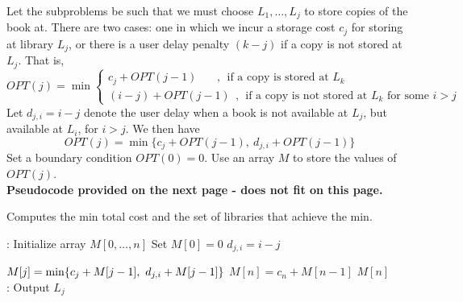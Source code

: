 \documentclass[twoside,11pt]{homework}
\newcommand\NoProc{\renewcommand\algorithmicprocedure{}}
\begin{document}
\noindent
Let the subproblems be such that we must choose $L_1, \dots, L_j$ to store copies of the book at. There are two cases: one in which we incur a storage cost $c_j$ for storing at library $L_j$, or there is a user delay penalty $(k-j)$ if a copy is not stored at $L_j$.  That is, 
$$OPT(j) = \min 
\begin{cases} 
c_j + OPT(j-1) \ \ \ \ \ \ \ \ , \ \ \textrm{if a copy is stored at } L_k \\
 (i-j) + OPT(j-1) \ \ , \ \ \textrm{if a copy is not stored at } L_k \textrm{ for some } i > j
\end{cases}
$$
Let $d_{j, i} = i - j$ denote the user delay when a book is not available at $L_j$, but available at $L_i$, for $i>j$.  We then have
$$OPT(j) = \min \{c_j + OPT(j-1), \ d_{j, i} + OPT(j-1) \}  $$
Set a boundary condition $OPT(0) = 0$.   Use an array $M$ to store the values of $OPT(j)$.   \\

\noindent
\textbf{Pseudocode provided on the next page - does not fit on this page.}\\ 

\begin{algorithm}
\begin{algorithmic}[1]
\caption{Computes the min total cost and the set of libraries that achieve the min.}
\NoProc
{}:       
\State Initialize array $M[0,  \dots, n]$
\State Set $M[0] = 0$
\State $d_{j, i} = i - j$   
\EndFor
\EndFor

     
\State $M[j] = \mathlarger{\min \{c_j + M[j-1], \ d_{j, i} + M[j-1] \} }$
\EndFor
\State $M[n] = c_n + M[n-1]$     
\State \Return $M[n]$
\EndProcedure \\

:  
 \Return
\Else
{}
\State Output $L_j$
\State {}
\State {}
\EndIf
\EndIf
\EndProcedure
\end{algorithmic}
\end{algorithm}
\end{document}
